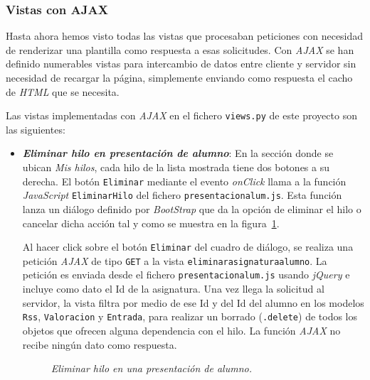 \documentclass[a4paper, 12pt]{book}
\begin{document}
\subsubsection{Vistas con AJAX} 
\label{sec:vistasajax}
Hasta ahora hemos visto todas las vistas que procesaban peticiones con necesidad de renderizar una plantilla como respuesta a esas solicitudes. Con 
\textit{AJAX} se han definido numerables vistas para intercambio de datos entre cliente y servidor sin necesidad de recargar la p\'agina, simplemente 
enviando como respuesta el cacho de \textit{HTML} que se necesita.

Las vistas implementadas con \textit{AJAX} en el fichero \texttt{views.py} de este proyecto son las siguientes:

\begin{itemize}
  \item {\bfseries \textit{Eliminar hilo en presentaci\'on de alumno}}: En la secci\'on donde se ubican \textit{Mis hilos}, cada hilo de la lista mostrada 
  tiene dos botones a su derecha. El bot\'on \texttt{Eliminar} mediante el evento \textit{onClick} llama a la funci\'on \textit{JavaScript} 
  \texttt{EliminarHilo} del fichero \texttt{presentacionalum.js}. Esta funci\'on lanza un di\'alogo definido por \textit{BootStrap} que da la opci\'on de
  eliminar el hilo o cancelar dicha acci\'on tal y como se muestra en la figura~\ref{fig:eliminarhiloalumno}. 
  
  Al hacer click sobre el bot\'on \texttt{Eliminar} del cuadro de di\'alogo, se realiza una petici\'on \textit{AJAX} de tipo \texttt{GET} a la vista 
  \texttt{eliminarasignaturaalumno}. La petici\'on es enviada desde el fichero \texttt{presentacionalum.js} usando \textit{jQuery} e incluye como dato el 
  Id de la asignatura. Una vez llega la solicitud al servidor, la vista filtra por medio de ese Id y del Id del alumno en los modelos \texttt{Rss}, 
  \texttt{Valoracion} y \texttt{Entrada}, para realizar un borrado (\texttt{.delete}) de todos los objetos que ofrecen alguna dependencia con el hilo. La 
  funci\'on \textit{AJAX} no recibe ning\'un dato como respuesta.
  
  \begin{figure}
    \centering
    \caption{\textit{Eliminar hilo en una presentaci\'on de alumno.}}
    \label{fig:eliminarhiloalumno}
  \end{figure}


\end{itemize}
\end{document}
